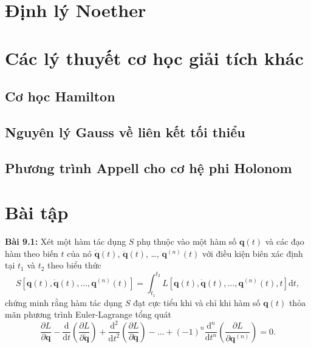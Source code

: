 \section{Định lý Noether}



\section{Các lý thuyết cơ học giải tích khác}

\subsection{Cơ học Hamilton}

\subsection{Nguyên lý Gauss về liên kết tối thiểu}

\subsection{Phương trình Appell cho cơ hệ phi Holonom}


\section{Bài tập}

\textbf{Bài 9.1:} Xét một hàm tác dụng \(S\) phụ thuộc vào một hàm số \(\mathbf{q}(t)\) và các đạo hàm theo biến \(t\) của nó \(\mathbf{\dot{q}}(t)\), \(\mathbf{\ddot{q}}(t)\), \ldots, \(\mathbf{q}^{(n)} (t)\) với điều kiện biên xác định tại \(t_1\) và \(t_2\) theo biểu thức
\begin{equation}
    S \left[\mathbf{q}(t), \mathbf{\dot{q}}(t), \ldots, \mathbf{q}^{(n)} (t)\right] = \int_{t_1}^{t_2} L\left[ \mathbf{q}(t), \mathbf{\dot{q}}(t), \ldots, \mathbf{q}^{(n)} (t), t \right] \mathrm{d}t,
\end{equation}
chứng minh rằng hàm tác dụng \(S\) đạt cực tiểu khi và chỉ khi hàm số \(\mathbf{q}(t)\) thỏa mãn phương trình Euler-Lagrange tổng quát
\begin{equation}
    \frac{\partial L}{\partial \mathbf{q}} - \frac{\mathrm{d}}{\mathrm{d}t} \left( \frac{\partial L}{\partial \mathbf{\dot{q}}} \right) + \dfrac{\mathrm{d}^2}{\mathrm{d} t^2} \left( \dfrac{\partial L}{\partial \mathbf{\ddot{q}}}\right) - \ldots + (-1)^n \frac{\mathrm{d}^n}{\mathrm{d}t^n} \left( \frac{\partial L}{\partial \mathbf{q}^{(n)}} \right) = 0.
\end{equation}

